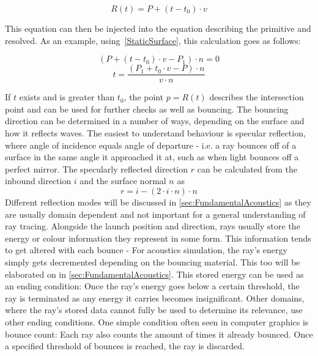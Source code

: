 \begin{equation}\label{RayEq}
    R(t) = P + (t - t_0) \cdot v
\end{equation}

This equation can then be injected into the equation describing the primitive and resolved.
As an example, using~\eqref{StaticSurface}, this calculation goes as follows:

\begin{equation*}
    (P + (t - t_0) \cdot v - P_1) \cdot n = 0
\end{equation*}
\begin{equation}\label{StaticSurfaceIntersect}
    t = \frac{(P_1 + t_0 \cdot v - P) \cdot n}{v \cdot n}
\end{equation}

If \(t\) exists and is greater than \(t_0\),
the point \(p = R(t)\) describes the intersection point and can be used for further checks
as well as bouncing.
\newline
The bouncing direction can be determined in a number of ways,
depending on the surface and how it reflects waves.
The easiest to understand behaviour is specular reflection,
where angle of incidence equals angle of departure -
i.e. a ray bounces off of a surface in the same angle it approached it at,
such as when light bounces off a perfect mirror.
The specularly reflected direction \(r\) can be calculated from the inbound direction \(i\) and the surface normal \(n\) as
\begin{equation}
    r = i - (2 \cdot i \cdot n) \cdot n
\end{equation}
Different reflection modes will be discussed in \autoref{sec:FundamentalAcoustics} as they are usually domain dependent
and not important for a general understanding of ray tracing.
\newline
Alongside the launch position and direction,
rays usually store the energy or colour information they represent in some form.
This information tends to get altered with each bounce -
For acoustics simulation, the ray's energy simply gets decremented depending on the bouncing material.
This too will be elaborated on in \autoref{sec:FundamentalAcoustics}.
\newline
This stored energy can be used as an ending condition:
Once the ray's energy goes below a certain threshold,
the ray is terminated as any energy it carries becomes insignificant.
Other domains, where the ray's stored data cannot fully be used to determine its relevance,
use other ending conditions.
One simple condition often seen in computer graphics is bounce count:
Each ray also counts the amount of times it already bounced.
Once a specified threshold of bounces is reached, the ray is discarded.

